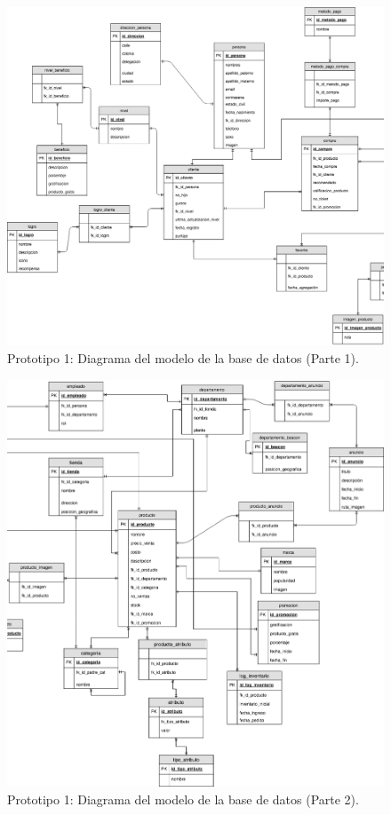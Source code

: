 \FloatBarrier
\begin{figure}[htbp!]
		\centering
			\includegraphics[width=1 \textwidth]{images/TT_database_parte1}
		\caption{Prototipo 1: Diagrama del modelo de la base de datos (Parte 1).}
		\label{image:prototipo1basededatos2}
\end{figure}
\FloatBarrier

\FloatBarrier
\begin{figure}[htbp!]
		\centering
			\includegraphics[width=1 \textwidth]{images/TT_database_parte2}
		\caption{Prototipo 1: Diagrama del modelo de la base de datos (Parte 2).}
		\label{image:prototipo1basededatos3}
\end{figure}
\FloatBarrier

